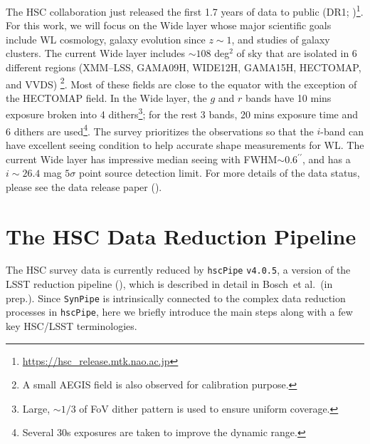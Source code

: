 \documentclass[useamsfonts]{pasj01}
\def\asec{$^{\prime\prime}$}
\def\etal{{\ et al.~}}
\def\hscpipe{\texttt{hscPipe}}
\def\synpipe{\texttt{SynPipe}}
\begin{document}
    The HSC collaboration just released the first 1.7 years of data to public (DR1;
    \citealt{HSCDR1})\footnote{\url{https://hsc_release.mtk.nao.ac.jp}}.
    For this work, we will focus on the Wide layer whose major scientific goals include
    WL cosmology, galaxy evolution since $z{\sim}1$, and studies of galaxy clusters.
    The current Wide layer includes ${\sim}108$ deg$^2$ of sky that are isolated in
    6 different regions (XMM--LSS, GAMA09H, WIDE12H, GAMA15H, HECTOMAP, and VVDS)
    \footnote{A small AEGIS field is also observed for calibration purpose.}.
    Most of these fields are close to the equator with the exception of the HECTOMAP
    field.
    In the Wide layer, the $g$ and $r$ bands have 10 mins exposure broken into 4
    dithers\footnote{Large, ${\sim}1/3$ of FoV dither pattern is used to ensure
    uniform coverage.}; for the rest 3 bands, 20 mins exposure time and 6 dithers are
    used\footnote{Several 30s exposures are taken to improve the dynamic range.}.
    The survey prioritizes the observations so that the $i$-band can have excellent
    seeing condition to help accurate shape measurements for WL.
    The current Wide layer has impressive median seeing with FWHM${\sim}0.6$\asec{},
    and has a $i{\sim} 26.4$ mag $5\sigma$ point source detection limit.
    For more details of the data status, please see the data release paper
    (\citealt{HSCDR1}).

\section{The HSC Data Reduction Pipeline}
    \label{ssec:hscpipe}

    The HSC survey data is currently reduced by \hscpipe{} \texttt{v4.0.5}, a
    version of the LSST reduction pipeline (\citealt{Ivezic2008, Axelrod2010,
    Juric2015}), which is described in detail in Bosch\etal (in prep.).
    Since \synpipe{} is intrinsically connected to the complex data reduction
    processes in \hscpipe{}, here we briefly introduce the main steps along with
    a few key HSC/LSST terminologies.
\end{document}
